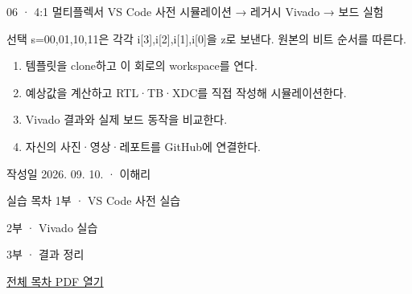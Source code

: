 
\renewcommand{\labonehome}{\hyperlink{legacy-06-contents}{\contentsbutton}}
\renewcommand{\legacySource}[1]{}
\providecommand{\terminalbox}[1]{\par\vspace{0.15cm}{\setlength{\fboxsep}{7pt}\colorbox{black}{\parbox{\dimexpr\textwidth-14pt\relax}{\color{white}\ttfamily\fontsize{7}{9}\selectfont #1}}}\par\vspace{0.15cm}}

\begingroup
\renewcommand{\small}{\fontsize{9}{11}\selectfont}
\begin{frame}{06 · 4:1 멀티플렉서}\relax
\small
VS Code 사전 시뮬레이션 → 레거시 Vivado → 보드 실험\par\vspace{0.22cm}선택 s=00,01,10,11은 각각 i[3],i[2],i[1],i[0]을 z로 보낸다. 원본의 비트 순서를 따른다.\par\begin{enumerate}\setlength{\itemsep}{0.22cm}
\item 템플릿을 clone하고 이 회로의 workspace를 연다.
\item 예상값을 계산하고 RTL·TB·XDC를 직접 작성해 시뮬레이션한다.
\item Vivado 결과와 실제 보드 동작을 비교한다.
\item 자신의 사진·영상·레포트를 GitHub에 연결한다.
\end{enumerate}
작성일 2026. 09. 10. · 이해리\par
\end{frame}

\begin{frame}[label=legacy-06-contents]{실습 목차}\relax
\small
1부 · VS Code 사전 실습\par{}\par\vspace{0.2cm}
\par\vspace{0.4cm}
2부 · Vivado 실습\par{}\par\vspace{0.4cm}
3부 · 결과 정리\par{}\par\vspace{0.35cm}
\href{04.LAB1_00_CONTENTS.pdf}{전체 목차 PDF 열기}
\end{frame}

